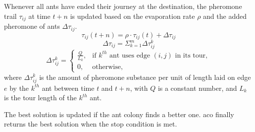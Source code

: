 Whenever all ants have ended their journey at the destination, the pheromone trail $\tau_{ij}$ at time $t+n$ is updated based on the evaporation rate $\rho$ and the added pheromone of ants $\Delta \tau_{ij}$.  
\begin{equation}
	\label{eq:aco_update}
	\tau_{ij}(t+n) = \rho \cdot \tau_{ij}(t) + \Delta \tau_{ij}
\end{equation}
\begin{equation}
	\label{equa:aco_add}
	\Delta \tau_{ij} = \Sigma^m_{k=1} \Delta \tau_{ij}^k
\end{equation}
\begin{equation}
	\label{equa:aco_pher}
	\Delta \tau_{ij}^k = 
	\begin{cases}
		\frac{Q}{L_k} , & \text{if $k^{th}$ ant uses edge $(i,j)$ in its tour},\\
		0, & \text{otherwise},
	\end{cases}  
\end{equation}
where $\Delta \tau_{ij}^k$ is the amount of pheromone substance per unit of length laid on edge $e$ by the $k^{th}$ ant between time $t$ and $t + n$, with $Q$ is a constant number, and $L_k$ is the tour length of the $k^{th}$ ant.

The best solution is updated if the ant colony finds a better one. \gls{aco} finally returns the best solution when the stop condition is met.


